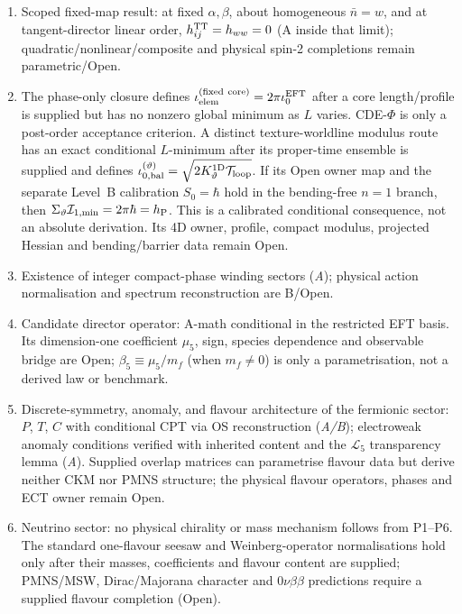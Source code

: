 \documentclass[11pt,a4paper]{article}
\begin{document}
\begin{enumerate}
  embedding in the displayed minimal algebra.  P7 is the adopted Level-B
  rank-three bundle postulate with fibrewise $SU(3)$ reduced structure group;
  its physical connection, action and matter map, and alternative completion
  classes remain Open.
\item Scoped fixed-map result: at fixed $\alpha,\beta$, about homogeneous $\bar n=w$, and at tangent-director linear order, $h_{ij}^{\rm TT}=h_{ww}=0$ (A inside that limit); quadratic/nonlinear/composite and physical spin-2 completions remain parametric/Open.
\item The phase-only closure defines $\iota_{\rm elem}^{\rm(fixed\ core)}=2\pi \iota_0^{\rm EFT}$ after a core length/profile is supplied but has no nonzero global minimum as $L$ varies.  CDE-$\Phi$ is only a post-order acceptance criterion.  A distinct texture-worldline modulus route has an exact conditional $L$-minimum after its proper-time ensemble is supplied and defines $\iota_{0,\rm bal}^{(\vartheta)}=\sqrt{2K_\vartheta^{1\mathrm D}\mathcal T_{\rm loop}}$.  If its Open owner map and the separate Level~B calibration $S_0=\hbar$ hold in the bending-free $n=1$ branch, then $\Sigma_\vartheta\mathcal I_{1,\min}=2\pi\hbar=h_{\rm P}$.  This is a calibrated conditional consequence, not an absolute derivation.  Its 4D owner, profile, compact modulus, projected Hessian and bending/barrier data remain Open.
\item Existence of integer compact-phase winding sectors (\emph{A}); physical action normalisation and spectrum reconstruction are B/Open.
\item Candidate director operator: A-math conditional in the restricted EFT
basis.  Its dimension-one coefficient $\mu_5$, sign, species dependence and
observable bridge are Open; $\beta_5\equiv\mu_5/m_f$ (when $m_f\ne0$) is only
a parametrisation, not a derived law or benchmark.
\item Discrete-symmetry, anomaly, and flavour architecture of the fermionic sector: $P$, $T$, $C$ with conditional CPT via OS reconstruction (\emph{A/B}); electroweak anomaly conditions verified with inherited content and the $\mathcal{L}_5$ transparency lemma (\emph{A}).  Supplied overlap matrices can parametrise flavour data but derive neither CKM nor PMNS structure; the physical flavour operators, phases and ECT owner remain Open.
\item Neutrino sector: no physical chirality or mass mechanism follows from P1--P6.  The standard one-flavour seesaw and Weinberg-operator normalisations hold only after their masses, coefficients and flavour content are supplied; PMNS/MSW, Dirac/Majorana character and $0\nu\beta\beta$ predictions require a supplied flavour completion (Open).
\end{enumerate}
\end{document}

